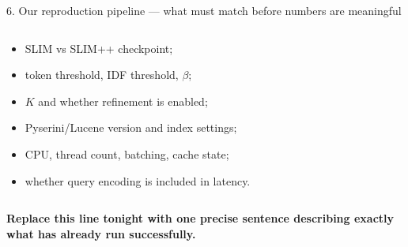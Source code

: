 \documentclass[aspectratio=169,9pt]{beamer}
\newcommand{\warn}[1]{\textcolor{amber}{\textbf{#1}}}
\begin{document}
\begin{frame}[t]{6. Our reproduction pipeline — what must match before numbers are meaningful}
\begin{columns}[T,totalwidth=\textwidth]
\begin{darkbox}
\begin{itemize}
\item SLIM vs SLIM++ checkpoint;
\item token threshold, IDF threshold, $\beta$;
\item $K$ and whether refinement is enabled;
\item Pyserini/Lucene version and index settings;
\item CPU, thread count, batching, cache state;
\item whether query encoding is included in latency.
\end{itemize}
\end{darkbox}
\end{columns}
\vspace{0.12cm}
\begin{darkbox}
\centering\scriptsize \warn{Replace this line tonight with one precise sentence describing exactly what has already run successfully.}
\end{darkbox}
\end{frame}
\end{document}

